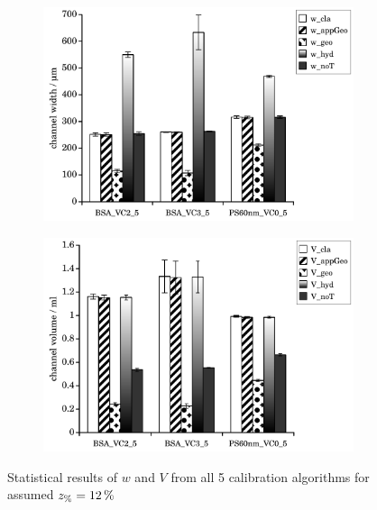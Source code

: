 \begin{figure}[htp]
  \begin{center}
    \begin{subfigure}{\subFigSize}
      \includegraphics[width=\linewidth]{./images/data/eval_own_p12/ownData_w_p12.pdf}
    \end{subfigure}
    \begin{subfigure}{\subFigSize}
      \includegraphics[width=\linewidth]{./images/data/eval_own_p12/ownData_V_p12.pdf}
    \end{subfigure}
  \end{center}
  \vspace*{-4ex}    
  \caption[Statistical results of $w$ and $V$ from all 5 calibration algorithms for assumed $\zP = \SI{12}{\percent}$]{
    Statistical results of $w$ and $V$ from all 5 calibration algorithms for assumed $\zP = \SI{12}{\percent}$
  }
 \label{fig:statCalibResP12}
\end{figure}
